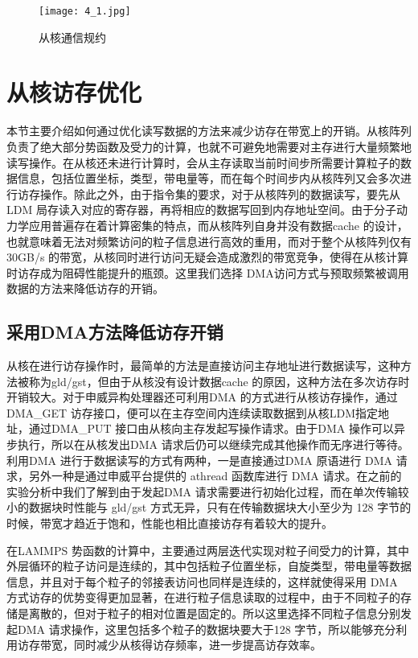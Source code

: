  \begin{figure}[h]
  \centering
  \texttt{[image: 4\_1.jpg]}
  \caption{从核通信规约}
  \label{fig:badge}
\end{figure}

\section{从核访存优化}
本节主要介绍如何通过优化读写数据的方法来减少访存在带宽上的开销。从核阵列负责了绝大部分势函数及受力的计算，也就不可避免地需要对主存进行大量频繁地读写操作。在从核还未进行计算时，会从主存读取当前时间步所需要计算粒子的数据信息，包括位置坐标，类型，带电量等，而在每个时间步内从核阵列又会多次进行访存操作。除此之外，由于指令集的要求，对于从核阵列的数据读写，要先从LDM 局存读入对应的寄存器，再将相应的数据写回到内存地址空间。由于分子动力学应用普遍存在着计算密集的特点，而从核阵列自身并没有数据cache 的设计，也就意味着无法对频繁访问的粒子信息进行高效的重用，而对于整个从核阵列仅有 30GB/s 的带宽，从核同时进行访问无疑会造成激烈的带宽竞争，使得在从核计算时访存成为阻碍性能提升的瓶颈。这里我们选择 DMA访问方式与预取频繁被调用数据的方法来降低访存的开销。

\subsection{采用DMA方法降低访存开销}
从核在进行访存操作时，最简单的方法是直接访问主存地址进行数据读写，这种方法被称为gld/gst，但由于从核没有设计数据cache 的原因，这种方法在多次访存时开销较大。对于申威异构处理器还可利用DMA 的方式进行从核访存操作，通过DMA\_GET 访存接口，便可以在主存空间内连续读取数据到从核LDM指定地址，通过DMA\_PUT 接口由从核向主存发起写操作请求。由于DMA 操作可以异步执行，所以在从核发出DMA 请求后仍可以继续完成其他操作而无序进行等待。利用DMA 进行于数据读写的方式有两种，一是直接通过DMA 原语进行 DMA 请求，另外一种是通过申威平台提供的 athread 函数库进行 DMA 请求。在之前的实验分析中我们了解到由于发起DMA 请求需要进行初始化过程，而在单次传输较小的数据块时性能与 gld/gst 方式无异，只有在传输数据块大小至少为 128 字节的时候，带宽才趋近于饱和，性能也相比直接访存有着较大的提升。

在LAMMPS 势函数的计算中，主要通过两层迭代实现对粒子间受力的计算，其中外层循环的粒子访问是连续的，其中包括粒子位置坐标，自旋类型，带电量等数据信息，并且对于每个粒子的邻接表访问也同样是连续的，这样就使得采用 DMA 方式访存的优势变得更加显著，在进行粒子信息读取的过程中，由于不同粒子的存储是离散的，但对于粒子的相对位置是固定的。所以这里选择不同粒子信息分别发起DMA 请求操作，这里包括多个粒子的数据块要大于128 字节，所以能够充分利用访存带宽，同时减少从核得访存频率，进一步提高访存效率。


